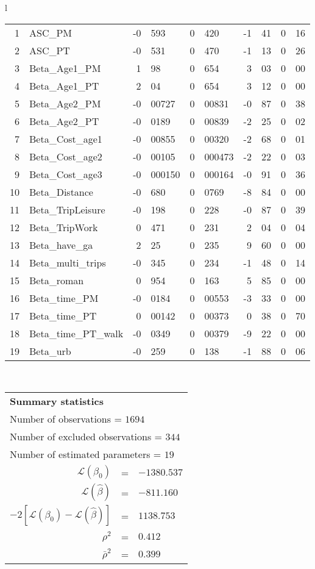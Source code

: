 \begin{tabular}{l}
\begin{tabular}{rlr@{.}lr@{.}lr@{.}lr@{.}l}
1 & ASC_PM  & -0&593 & 0&420 & -1&41 & 0&16\\
2 & ASC_PT & -0&531 & 0&470 & -1&13 & 0&26\\
3 & Beta_Age1_PM & 1&98 & 0&654 & 3&03 & 0&00\\
4 & Beta_Age1_PT & 2&04 & 0&654 & 3&12 & 0&00\\
5 & Beta_Age2_PM & -0&00727 & 0&00831 & -0&87 & 0&38\\
6 & Beta_Age2_PT & -0&0189 & 0&00839 & -2&25 & 0&02\\
7 & Beta_Cost_age1 & -0&00855 & 0&00320 & -2&68 & 0&01\\
8 & Beta_Cost_age2 & -0&00105 & 0&000473 & -2&22 & 0&03\\
9 & Beta_Cost_age3 & -0&000150 & 0&000164 & -0&91 & 0&36\\
10 & Beta_Distance & -0&680 & 0&0769 & -8&84 & 0&00\\
11 & Beta_TripLeisure & -0&198 & 0&228 & -0&87 & 0&39\\
12 & Beta_TripWork & 0&471 & 0&231 & 2&04 & 0&04\\
13 & Beta_have_ga & 2&25 & 0&235 & 9&60 & 0&00\\
14 & Beta_multi_trips & -0&345 & 0&234 & -1&48 & 0&14\\
15 & Beta_roman & 0&954 & 0&163 & 5&85 & 0&00\\
16 & Beta_time_PM & -0&0184 & 0&00553 & -3&33 & 0&00\\
17 & Beta_time_PT & 0&00142 & 0&00373 & 0&38 & 0&70\\
18 & Beta_time_PT_walk & -0&0349 & 0&00379 & -9&22 & 0&00\\
19 & Beta_urb & -0&259 & 0&138 & -1&88 & 0&06\\
\hline
\end{tabular}
\\
\begin{tabular}{rcl}
\multicolumn{3}{l}{\bf Summary statistics}\\
\multicolumn{3}{l}{ Number of observations = $1694$} \\
\multicolumn{3}{l}{ Number of excluded observations = $344$} \\
\multicolumn{3}{l}{ Number of estimated  parameters = $19$} \\
 $\mathcal{L}(\beta_0)$ &=&  $-1380.537$ \\
 $\mathcal{L}(\hat{\beta})$ &=& $-811.160 $  \\
 $-2[\mathcal{L}(\beta_0) -\mathcal{L}(\hat{\beta})]$ &=& $1138.753$ \\
    $\rho^2$ &=&   $0.412$ \\
    $\bar{\rho}^2$ &=&    $0.399$ \\
\end{tabular}
  \end{tabular}
